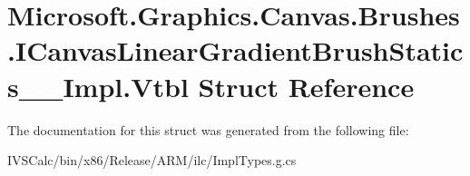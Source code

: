 \hypertarget{struct_microsoft_1_1_graphics_1_1_canvas_1_1_brushes_1_1_i_canvas_linear_gradient_brush_statics_____impl_1_1_vtbl}{}\section{Microsoft.\+Graphics.\+Canvas.\+Brushes.\+I\+Canvas\+Linear\+Gradient\+Brush\+Statics\+\_\+\+\_\+\+Impl.\+Vtbl Struct Reference}
\label{struct_microsoft_1_1_graphics_1_1_canvas_1_1_brushes_1_1_i_canvas_linear_gradient_brush_statics_____impl_1_1_vtbl}


The documentation for this struct was generated from the following file\+:\begin{DoxyCompactItemize}
\item 
I\+V\+S\+Calc/bin/x86/\+Release/\+A\+R\+M/ilc/Impl\+Types.\+g.\+cs\end{DoxyCompactItemize}
